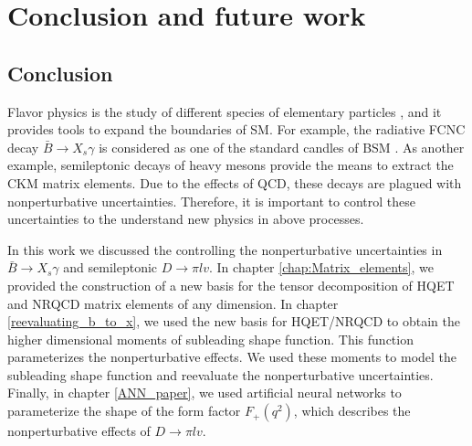 \chapter{Conclusion and future work}
\section{Conclusion}
Flavor physics is the study of different species of elementary particles \cite{flavor_phys}, and it provides tools to expand the boundaries of SM. For example, the radiative FCNC decay $\bar{B}\to X_s\gamma$ is considered as one of the standard candles of BSM \cite{Neubert:2005mu}. As another example, semileptonic decays of heavy mesons provide the means to extract the CKM matrix elements. Due to the effects of QCD, these decays are plagued with nonperturbative uncertainties. Therefore, it is important to control these uncertainties to the understand new physics in above processes. 
\par 
In this work we discussed the controlling the nonperturbative uncertainties in $\bar{B}\to X_s\gamma$ and semileptonic $D\to \pi l v$. In chapter \ref{chap:Matrix_elements}, we provided the construction of a new basis for the tensor decomposition of HQET and NRQCD matrix elements of any dimension. In chapter \ref{reevaluating_b_to_x}, we used the new basis for HQET/NRQCD to obtain the higher dimensional moments of subleading shape function. This function parameterizes the nonperturbative effects. We used these moments to model the subleading shape function and reevaluate the nonperturbative uncertainties. Finally, in chapter \ref{ANN_paper}, we used artificial neural networks to parameterize the shape of the form factor $F_+(q^2)$, which describes the nonperturbative effects of $D\to\pi l v$. 

